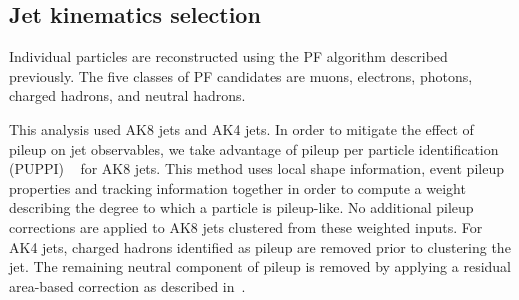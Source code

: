 \subsection{Jet kinematics selection\label{ss:JetSel}}

Individual particles are reconstructed using the PF algorithm described previously. The five classes of PF candidates are  muons, electrons, photons, charged hadrons, and neutral hadrons. 

This analysis used AK8 jets and AK4 jets.
In order to mitigate the effect of pileup on jet observables, we take advantage of pileup per particle identification (PUPPI) ~\cite{puppi} for AK8 jets. This method uses local shape information, event pileup properties and tracking information together in order to compute a weight describing the degree to which a particle is pileup-like. No additional pileup corrections are applied to AK8 jets clustered from these weighted inputs. For AK4 jets, charged hadrons identified as pileup are removed prior to clustering the jet. The remaining neutral component of pileup is removed by applying a residual area-based correction as described in~\cite{1126-6708-2008-04-005, Cacciari:2007fd}.

